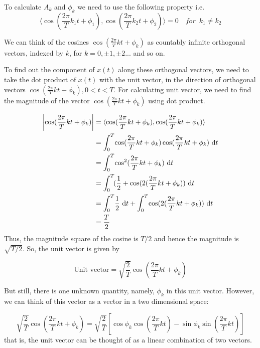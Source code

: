 \noindent
To calculate $A_k$ and $\phi_k$ we need to use the following property i.e.
\begin{equation*}
\langle \cos (\frac{2\pi}{T}k_1t + \phi_1), \cos (\frac{2\pi}{T}k_2t + \phi_2) \rangle = 0 \enspace \enspace		for \enspace k_1 \neq k_2 \end{equation*}

\noindent
We can think of the cosines $\cos (\frac{2\pi}{T}kt + \phi_k)$ as countably infinite orthogonal vectors, indexed by $k$, for $k=0, \pm1, \pm2...$ and so on.

\noindent
To find out the component of $x(t)$ along these orthogonal vectors, we need to take the dot product of $x(t)$ with the unit vector, in the direction of orthogonal vectors $\cos(\frac{2\pi}{T}kt + \phi_k), 0<t<T$.
For calculating unit vector, we need to find the magnitude of the vector $\cos(\frac{2\pi}{T}kt + \phi_k)$ using dot product.

\begin{align*} \left|\cos(\frac{2\pi}{T}kt + \phi_k)\right| &= \langle \cos (\frac{2\pi}{T}kt + \phi_k), \cos (\frac{2\pi}{T}kt + \phi_k)\rangle \\
  &= \int_{0}^{T} \! \cos (\frac{2\pi}{T}kt + \phi_k) \cos (\frac{2\pi}{T}kt + \phi_k) \ \mathrm{d} t \\
  &= \int_{0}^{T} \! \cos^2 (\frac{2\pi}{T}kt + \phi_k) \ \mathrm{d} t \\
  &= \int_{0}^{T} \! (\frac{1}{2} + \cos (2(\frac{2\pi}{T}kt + \phi_k)) \ \mathrm{d} t \\
  &= \int_{0}^{T} \! \frac{1}{2} \ \mathrm{d} t + \int_{0}^{T} \! \cos (2(\frac{2\pi}{T}kt + \phi_k)) \ \mathrm{d} t \\
  &= \frac{T}{2}
\end{align*}
Thus, the magnitude square of the cosine is $T/2$ and hence the magnitude is $\sqrt{T/2}$. So, the unit vector is given by

\begin{equation*} \textrm{Unit vector} = \sqrt{\frac{2}{T}}\cos (\frac{2\pi}{T}kt + \phi_k)\end{equation*}
                    
\noindent
But still, there is one unknown quantity, namely, $\phi_k$ in this unit vector. However, we can think of this vector as a vector in a two dimensional space:

\begin{equation*}\sqrt{\frac{2}{T}}\cos (\frac{2\pi}{T}kt + \phi_k) = \sqrt{\frac{2}{T}}[\cos\phi_k\cos (\frac{2\pi}{T}kt) - \sin\phi_k\sin (\frac{2\pi}{T}kt)] \end{equation*}
that is, the unit vector can be thought of as a linear combination of two vectors.

